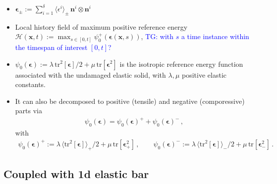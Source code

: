 \documentclass[11pt,a4paper]{article}
\newcommand{\tg}[1]{\textcolor{blue}{TG: #1} }
\newcommand{\bb}[1]{\boldsymbol{#1}}
\begin{document}
\begin{itemize}
\item $\bb{\epsilon}_{\pm} := \sum_{i=1}^\delta \langle \epsilon^i \rangle_\pm \, \mathbf{n}^i \otimes \mathbf{n}^i$ 

\item Local history field of maximum positive reference energy $\mathcal{H}(\bb{x},t) := \max_{s \in [0,t]} \psi_0^+(\bb{\epsilon}(\bb{x},s))$, \tg{with $s$ a time instance within the timespan of interest $[0,t]$?}

\item $\psi_0(\bb{\epsilon}) := \lambda \, \text{tr}^2[\bb{\epsilon}]/2 + \mu \, \text{tr}[\bb{\epsilon}^2]$ is the isotropic reference energy function associated with the undamaged elastic solid, with $\lambda, \mu$ positive elastic constants.

\item It can also be decomposed to positive (tensile) and negative (comporessive) parts via 
\begin{align*}
    \psi_0(\bb{\epsilon}) = \psi_0(\bb{\epsilon})^+ + \psi_0(\bb{\epsilon})^-
    \,,
\end{align*}
with 
\begin{align*}
    \psi_0(\bb{\epsilon})^+ 
    :=
    \lambda \, \langle \text{tr}^2[\bb{\epsilon}]\rangle_+/2 
    + \mu \, \text{tr}[\bb{\epsilon}_+^2]
    \,, \qquad
    \psi_0(\bb{\epsilon})^- 
    :=
    \lambda \, \langle \text{tr}^2[\bb{\epsilon}]\rangle_-/2 
    + \mu \, \text{tr}[\bb{\epsilon}_-^2]
    \,.
\end{align*}

\end{itemize}

\subsection{Coupled with 1d elastic bar}
\end{document}
